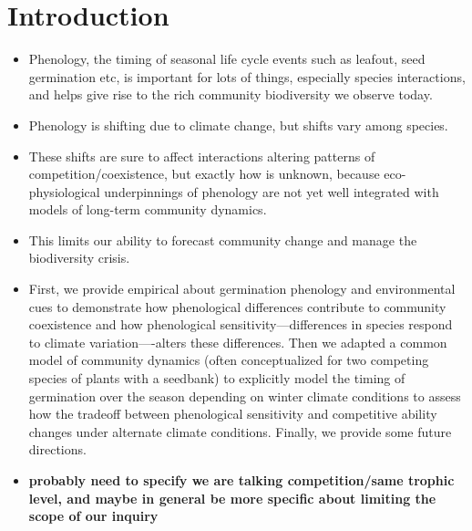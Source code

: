 \documentclass{article}[12pt]
\begin{document}


\section{Introduction}
\begin{itemize}
\item Phenology, the timing of seasonal life cycle events such as leafout, seed germination etc, is important for lots of things, especially species interactions, and helps give rise to the rich community biodiversity we observe today.
\item Phenology is shifting due to climate change, but shifts vary among species.
\item These shifts are sure to affect interactions altering patterns of competition/coexistence, but exactly how is unknown, because eco-physiological underpinnings of phenology are not yet well integrated with models of long-term community dynamics.
\item This limits our ability to forecast community change and manage the biodiversity crisis.
\item First, we provide empirical about germination phenology and environmental cues to demonstrate how phenological differences contribute to community coexistence and how phenological sensitivity---differences in  species respond to climate variation----alters these differences. Then we adapted a common model of community dynamics (often conceptualized for two competing species of plants with a seedbank) to explicitly model the timing of germination over the season depending on winter climate conditions to assess how the tradeoff between phenological sensitivity and competitive ability changes under alternate climate conditions. Finally, we provide some future directions.

\item \textbf{probably need to specify we are talking competition/same trophic level, and maybe in general be more specific about limiting the scope of our inquiry}
\end{itemize}
\end{document}
